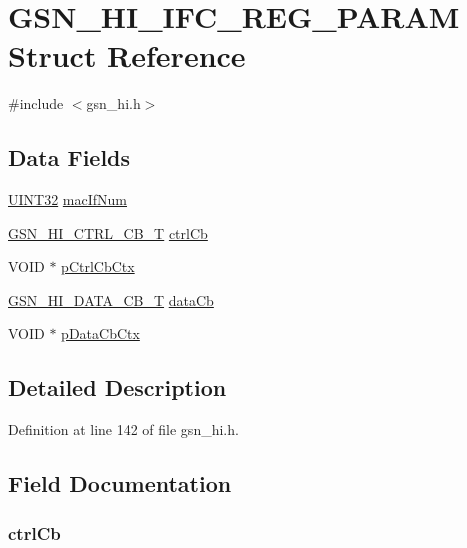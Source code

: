 \hypertarget{a00087}{
\section{GSN\_\-HI\_\-IFC\_\-REG\_\-PARAM Struct Reference}
\label{a00087}
}


{\ttfamily \#include $<$gsn\_\-hi.h$>$}

\subsection*{Data Fields}
\begin{DoxyCompactItemize}
\item 
\hyperlink{a00660_gae1e6edbbc26d6fbc71a90190d0266018}{UINT32} \hyperlink{a00087_aacea9b36a9084b16b483db4716bf7ea1}{macIfNum}
\item 
\hyperlink{a00504_a9943ae3de497f108841d00f0b80ff390}{GSN\_\-HI\_\-CTRL\_\-CB\_\-T} \hyperlink{a00087_aa442cd2da00312533e65bc43814eee7b}{ctrlCb}
\item 
VOID $\ast$ \hyperlink{a00087_ad5ece2cca5793c5c804c56153c57be66}{pCtrlCbCtx}
\item 
\hyperlink{a00504_a01ca163707bf2c00971f4e2a9b96fb46}{GSN\_\-HI\_\-DATA\_\-CB\_\-T} \hyperlink{a00087_ab5e0c9ef2bdc4d0e354528b1080f21bc}{dataCb}
\item 
VOID $\ast$ \hyperlink{a00087_aaac1b748e9426eb856106f9227f7634d}{pDataCbCtx}
\end{DoxyCompactItemize}


\subsection{Detailed Description}


Definition at line 142 of file gsn\_\-hi.h.



\subsection{Field Documentation}
\hypertarget{a00087_aa442cd2da00312533e65bc43814eee7b}{
\subsubsection[{ctrlCb}]{ {\bf ctrlCb}}}
\label{a00087_aa442cd2da00312533e65bc43814eee7b}


